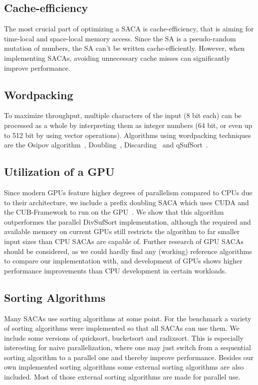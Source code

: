 \subsection{Cache-efficiency}

The most crucial part of optimizing a SACA is cache-efficiency, that is aiming for time-local and space-local memory access.
Since the SA is a pseudo-random mutation of numbers, the SA can't be written cache-efficiently.
However, when implementing SACAs, avoiding unnecessary cache misses can significantly improve performance.

\subsection{Wordpacking}

To maximize throughput, multiple characters of the input (8 bit each) can be processed as a whole by
interpreting them as integer numbers (64 bit, or even up to 512 bit by using vector operations).
Algorithms using wordpacking techniques are the Osipov algorithm~\cite{osipovGPU},
Doubling~\cite{saca:11}, Discarding~\cite{saca:11} and qSufSort~\cite{saca:1}.

\subsection{Utilization of a GPU}

Since modern GPUs feature higher degrees of parallelism compared to CPUs due to their architecture,
we include a prefix doubling SACA which uses CUDA and the CUB-Framework to run on the GPU~\cite{osipovGPU}.
We show that this algorithm outperformes the parallel DivSufSort implementation,
although the required and available memory on current GPUs still restricts the algorithm to far smaller input sizes than CPU SACAs are capable of.
Further research of GPU SACAs should be considered,
as we could hardly find any (working) reference algorithms to compare our implementation with, 
and development of GPUs shows higher performance improvements than CPU development in certain workloads.

\subsection{Sorting Algorithms}

Many SACAs use sorting algorithms at some point. For the benchmark a variety of sorting algorithms were implemented so that all SACAs can use them.
We include some versions of quicksort, bucketsort and radixsort.
This is especially interesting for naive parallelization, where one may just switch from a sequential sorting algorithm to a parallel one
and thereby improve performance.
Besides our own implemented sorting algorithms some external sorting algorithms are also included.
Most of those external sorting algorithms are made for parallel use.


